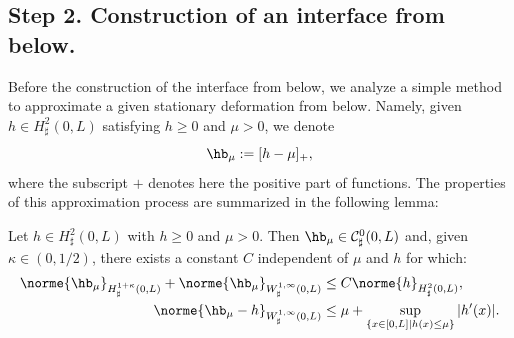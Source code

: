 \subsection{Step 2. Construction of an interface from below.}
Before the construction of the interface from below, we analyze a simple method to approximate a given stationary deformation from below. Namely, given $h \in H^2_{\sharp}(0,L)$ satisfying $h \geq 0$ and $\mu >0$, we denote
\[
\hb_{\mu} := [h-\mu]_{+},
\]
where the subscript $+$ denotes here the positive part of functions. The properties of this approximation process
are summarized in the following lemma:
\begin{lemma}\label{lemma.halpha}
Let $h \in H^{2}_{\sharp}(0,L)$ with $h \geq 0$ and $\mu >0$.
Then $\hb_{\mu}\in \mathcal{C}_\sharp^{0}(0,L)$ and, given $\kappa \in (0,1/2)$, there exists a constant $C$
independent of $\mu$ and $h$ for which:
\begin{align}
\norme{\hb_{\mu}}_{H_\sharp^{1+\kappa}(0,L)} + \norme{\hb_{\mu}}_{W^{1,\infty}_\sharp(0,L)}&\leq C\norme{h}_{H_\sharp^{2}(0,L)}, \label{h1}\\
\norme{\hb_{\mu}-h}_{W_\sharp^{1, \infty}(0,L)}&\leq {\mu}+\sup_{\{x\in[0, L]\mid h(x)\leq \mu\}}\vert h'(x)\vert.\label{h2}
\end{align}
\end{lemma}
